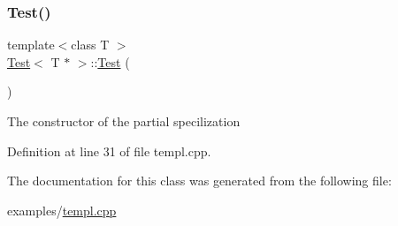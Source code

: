 \subsubsection{\texorpdfstring{Test()}{Test()}}
{\footnotesize\ttfamily template$<$class T $>$ \\
\mbox{\hyperlink{class_test}{Test}}$<$ T $\ast$ $>$\+::\mbox{\hyperlink{class_test}{Test}} (\begin{DoxyParamCaption}{ }\end{DoxyParamCaption})}

The constructor of the partial specilization 

Definition at line 31 of file templ.\+cpp.


\begin{DoxyCode}{0}

\end{DoxyCode}


The documentation for this class was generated from the following file\+:\begin{DoxyCompactItemize}
\item 
examples/\mbox{\hyperlink{templ_8cpp}{templ.\+cpp}}\end{DoxyCompactItemize}
